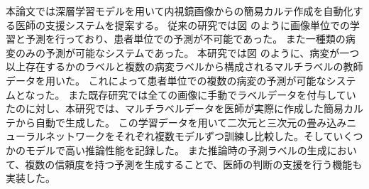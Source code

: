 本論文では深層学習モデルを用いて内視鏡画像からの簡易カルテ作成を自動化する医師の支援システムを提案する。
従来の研究では図%
のように画像単位での学習と予測を行っており、患者単位での予測が不可能であった。
また一種類の病変のみの予測が可能なシステムであった。
本研究では図%
のように、病変が一つ以上存在するかのラベルと複数の病変ラベルから構成されるマルチラベルの教師データを用いた。
これによって患者単位での複数の病変の予測が可能なシステムとなった。
また既存研究では全ての画像に手動でラベルデータを付与していたのに対し、本研究では、マルチラベルデータを医師が実際に作成した簡易カルテから自動で生成した。
この学習データを用いて二次元と三次元の畳み込みニューラルネットワークをそれぞれ複数モデルずつ訓練し比較した。そしていくつかのモデルで高い推論性能を記録した。
また推論時の予測ラベルの生成において、複数の信頼度を持つ予測を生成することで、医師の判断の支援を行う機能も実装した。
